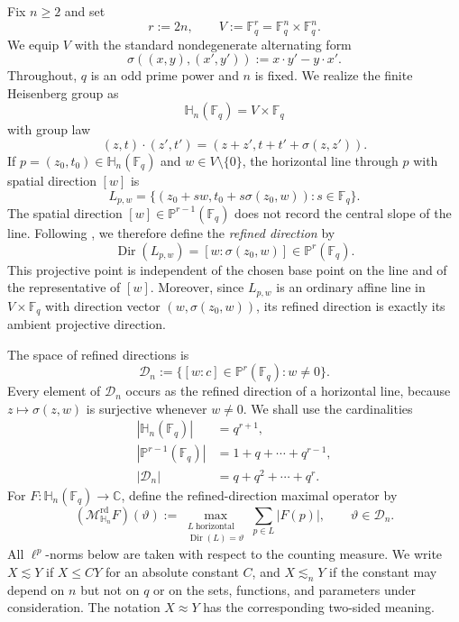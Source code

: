 \documentclass[11pt,letterpaper]{amsart}
\numberwithin{equation}{section}
\theoremstyle{definition}
\theoremstyle{remark}
\newcommand{\Fq}{\mathbb F_q}
\newcommand{\C}{\mathbb C}
\newcommand{\PP}{\mathbb P}
\newcommand{\HH}{\mathbb H}
\newcommand{\Dn}{\mathcal D_n}
\newcommand{\Mrd}{\mathcal M^{\mathrm{rd}}_{\HH_n}}
\newcommand{\Dir}{\operatorname{Dir}}
\begin{document}
Fix $n\geq2$ and set
\[
 r:=2n,
 \qquad
 V:=\Fq^r=\Fq^n\times\Fq^n.
\]
We equip $V$ with the standard nondegenerate alternating form
\begin{equation}\label{eq:symplectic-form}
 \sigma((x,y),(x',y')):=x\cdot y'-y\cdot x'.
\end{equation}
Throughout, $q$ is an odd prime power and $n$ is fixed.  We realize the
finite Heisenberg group as
\[
 \HH_n(\Fq)=V\times\Fq
\]
with group law
\begin{equation}\label{eq:group-law}
 (z,t)\cdot(z',t')
 =
 (z+z',t+t'+\sigma(z,z')).
\end{equation}
If $p=(z_0,t_0)\in\HH_n(\Fq)$ and $w\in V\setminus\{0\}$, the horizontal
line through $p$ with spatial direction $[w]$ is
\begin{equation}\label{eq:horizontal-line}
 L_{p,w}
 =
 \bigl\{
   (z_0+sw,t_0+s\sigma(z_0,w)):s\in\Fq
 \bigr\}.
\end{equation}
The spatial direction $[w]\in\PP^{r-1}(\Fq)$ does not record the central
slope of the line. Following \cite{PPTX26}, we therefore define the
\emph{refined direction} by
\begin{equation}\label{eq:refined-direction}
 \Dir(L_{p,w})
 =
 [w:\sigma(z_0,w)]
 \in\PP^r(\Fq).
\end{equation}
This projective point is independent of the chosen base point on the
line and of the representative of $[w]$.  Moreover, since
$L_{p,w}$ is an ordinary affine line in $V\times\Fq$ with direction
vector $(w,\sigma(z_0,w))$, its refined direction is exactly its ambient
projective direction.

The space of refined directions is
\begin{equation}\label{eq:direction-space}
 \Dn
 :=
 \bigl\{
 [w:c]\in\PP^r(\Fq):w\neq0
 \bigr\}.
\end{equation}
Every element of $\Dn$ occurs as the refined direction of a horizontal
line, because $z\mapsto\sigma(z,w)$ is surjective whenever $w\neq0$.
We shall use the cardinalities
\begin{equation}\label{eq:cardinalities}
 \begin{aligned}
 |\HH_n(\Fq)|&=q^{r+1},\\
 |\PP^{r-1}(\Fq)|&=1+q+\cdots+q^{r-1},\\
 |\Dn|&=q+q^2+\cdots+q^r.
 \end{aligned}
\end{equation}
For $F:\HH_n(\Fq)\to\C$, define the refined-direction maximal operator
by
\begin{equation}\label{eq:maximal-operator}
 (\Mrd F)(\vartheta)
 :=
 \max_{\substack{L\ \mathrm{horizontal}\\
                 \Dir(L)=\vartheta}}
 \sum_{p\in L}|F(p)|,
 \qquad
 \vartheta\in\Dn.
\end{equation}
All $\ell^p$-norms below are taken with respect to the counting measure.
We write $X\lesssim Y$ if $X\leq CY$ for an absolute constant $C$, and
$X\lesssim_nY$ if the constant may depend on $n$ but not on $q$ or on
the sets, functions, and parameters under consideration.  The notation
$X\approx Y$ has the corresponding two-sided meaning.
\end{document}
